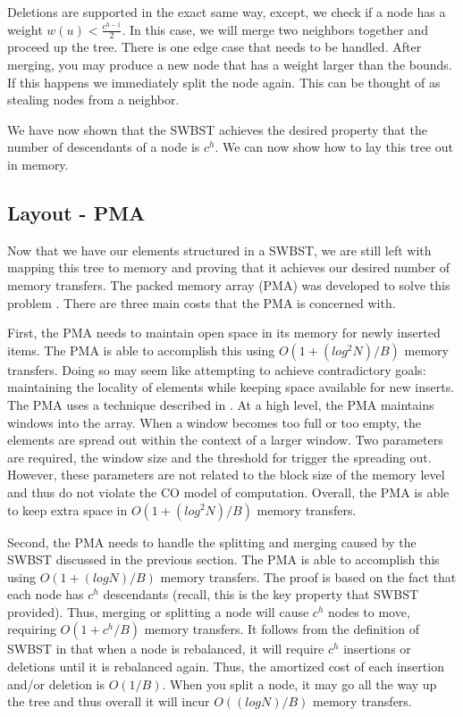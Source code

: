 \documentclass{style}
\begin{document}
Deletions are supported in the exact same way, except, we check if a node has
a weight $w(u) < \frac{c^{h-1}}{2}$. In this case, we will merge two neighbors
together and proceed up the tree. There is one edge case that needs to be
handled. After merging, you may produce a new node that has a weight larger
than the bounds. If this happens we immediately split the node again. This can
be thought of as stealing nodes from a neighbor.

We have now shown that the SWBST achieves the desired property that the number
of descendants of a node is $c^h$. We can now show how to lay this tree out in
memory.

\subsection{Layout - PMA}
\label{sec:layout}


Now that we have our elements structured in a SWBST, we are still left with
mapping this tree to memory and proving that it achieves our desired number of
memory transfers. The packed memory array (PMA) was developed to solve this
problem \cite{BenderDemainColton}. There are three main costs that the PMA is
concerned with.

First, the PMA needs to maintain open space in its memory for newly inserted
items. The PMA is able to accomplish this using $O(1 + (log^2 N) / B)$ memory
transfers. Doing so may seem like attempting to achieve contradictory goals:
maintaining the locality of elements while keeping space available for new
inserts. The PMA uses a technique described in \cite{packedmemoryarray}. At a
high level, the PMA maintains windows into the array. When a window becomes
too full or too empty, the elements are spread out within the context of a
larger window. Two parameters are required, the window size and the threshold
for trigger the spreading out. However, these parameters are not related to
the block size of the memory level and thus do not violate the CO model of
computation. Overall, the PMA is able to keep extra space in $O(1 + (log^2 N)
/ B)$ memory transfers.

Second, the PMA needs to handle the splitting and merging caused by the SWBST
discussed in the previous section. The PMA is able to accomplish this using
$O(1 + (log N) /B)$ memory transfers. The proof is based on the fact that each
node has $c^h$ descendants (recall, this is the key property that SWBST
provided). Thus, merging or splitting a node will cause $c^h$ nodes to move,
requiring $O(1 + c^h/B)$ memory transfers. It follows from the definition of
SWBST in \cite{swbst} that when a node is rebalanced, it will require $c^h$
insertions or deletions until it is rebalanced again. Thus, the amortized cost
of each insertion and/or deletion is $O(1/B)$. When you split a node, it may
go all the way up the tree and thus overall it will incur $O((log N) / B)$
memory transfers.
\end{document}
